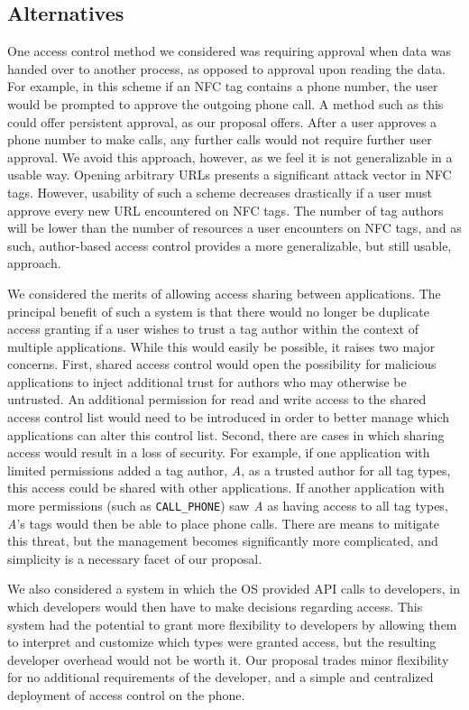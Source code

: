 \documentclass[12pt]{article}
\begin{document}
\subsection{Alternatives}
One access control method we considered was requiring approval when data was handed over to another process, as opposed to approval upon reading the data.
For example, in this scheme if an NFC tag contains a phone number, the user would be prompted to approve the outgoing phone call.
A method such as this could offer persistent approval, as our proposal offers.
After a user approves a phone number to make calls, any further calls would not require further user approval.
We avoid this approach, however, as we feel it is not generalizable in a usable way.
Opening arbitrary URLs presents a significant attack vector in NFC tags.
However, usability of such a scheme decreases drastically if a user must approve every new URL encountered on NFC tags.
The number of tag authors will be lower than the number of resources a user encounters on NFC tags, and as such, author-based access control provides a more generalizable, but still usable, approach.

We considered the merits of allowing access sharing between applications.
The principal benefit of such a system is that there would no longer be duplicate access granting if a user wishes to trust a tag author within the context of multiple applications.
While this would easily be possible, it raises two major concerns.
First, shared access control would open the possibility for malicious applications to inject additional trust for authors who may otherwise be untrusted.
An additional permission for read and write access to the shared access control list would need to be introduced in order to better manage which applications can alter this control list.
Second, there are cases in which sharing access would result in a loss of security.
For example, if one application with limited permissions added a tag author, \textit{A}, as a trusted author for all tag types, this access could be shared with other applications.
If another application with more permissions (such as \texttt{CALL\_PHONE}) saw \textit{A} as having access to all tag types, \textit{A}'s tags would then be able to place phone calls.
There are means to mitigate this threat, but the management becomes significantly more complicated, and simplicity is a necessary facet of our proposal.

We also considered a system in which the OS provided API calls to developers, in which developers would then have to make decisions regarding access.
This system had the potential to grant more flexibility to developers by allowing them to interpret and customize which types were granted access, but the resulting developer overhead would not be worth it.
Our proposal trades minor flexibility for no additional requirements of the developer, and a simple and centralized deployment of access control on the phone.
\end{document}

